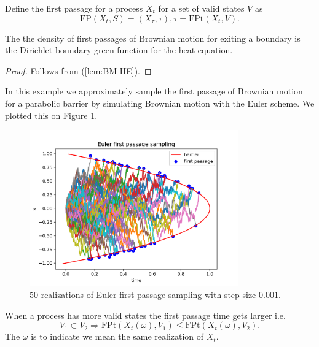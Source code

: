 \documentclass[a4paper,12pt]{article}
\begin{document}
\begin{definition} \label{def:first passage}
    Define the first passage for a process $X_{t}$ for a set of valid states
    $V$ as
    \begin{equation}
        \text{FP}(X_{t},S)=(X_{\tau},\tau), \tau = \text{FPt}(X_{t},V)
        .
    \end{equation}
\end{definition}

\begin{theorem}
    The the density of first passages of Brownian motion for  exiting a  boundary is  the
    Dirichlet boundary green function for the heat equation.
\end{theorem}

\begin{proof}
    Follows from (\ref{lem:BM HE}).
\end{proof}

\begin{example}
    In this example we approximately sample the first passage  of Brownian motion
    for a parabolic barrier by simulating Brownian motion with the Euler scheme. We plotted
    this on Figure \ref{fig:Euler first passage para}.

    \begin{figure}[ht!]
        \centering
        \includegraphics[width=0.8\textwidth]{plots/Euler first passage para.png}
        \caption{ $50$ realizations of Euler first passage sampling with step size $0.001$.}
        \label{fig:Euler first passage para}
    \end{figure}
\end{example}

\begin{lemma} \label{lem: FP order}
    When a process has more valid states the first passage time gets larger i.e.
    \begin{equation}
        V_{1} \subset V_{2} \Rightarrow
        \text{FPt}(X_{t}(\omega),V_{1}) \le  \text{FPt}(X_{t}(\omega),V_{2}) .
    \end{equation}
    The $\omega$ is to indicate we mean the same realization of $X_{t}$.
\end{lemma}
\end{document}
